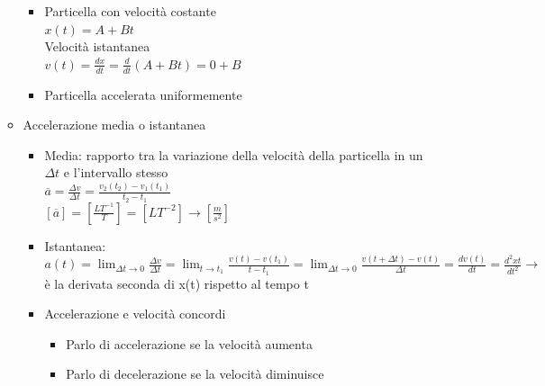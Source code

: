 \documentclass{report}
\begin{document}
\begin{itemize}
\begin{itemize}
\begin{itemize}
                  \item Particella con velocità costante\\$x(t)=A+Bt$\\Velocità istantanea\\$v(t)=\frac{dx}{dt}=\frac{d}{dt}(A+Bt)=0+B$
                  \item Particella accelerata uniformemente
                \end{itemize}
          \item Accelerazione media o istantanea
                \begin{itemize}
                  \item Media: rapporto tra la variazione della velocità della particella in un $\Delta t$ e l'intervallo stesso\\$\overline{a}=\frac{\Delta v}{\Delta t}=\frac{v_2(t_2)-v_1(t_1)}{t_2-t_1}$\\$[\overline{a}]=[\frac{LT^{-1}}{T}]=[LT^{-2}]\rightarrow[\frac{m}{s^2}]$
                  \item Istantanea:\\$a(t)=\lim_{\Delta t\to0}\frac{\Delta v}{\Delta t}=\lim_{t\to t_1}\frac{v(t)-v(t_1)}{t-t_1}=\lim_{\Delta t\to0}\frac{v(t+\Delta t)-v(t)}{\Delta t}=\frac{dv(t)}{dt}=\frac{d^2xt}{dt^2}\rightarrow $ è la derivata seconda di x(t) rispetto al tempo t
                  \item Accelerazione e velocità concordi
                        \begin{itemize}
                          \item Parlo di accelerazione se la velocità aumenta
                          \item Parlo di decelerazione se la velocità diminuisce
                        \end{itemize}

\end{itemize}
\end{itemize}
\end{itemize}
\end{document}
